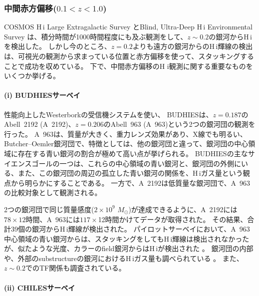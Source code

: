 \subsubsection{中間赤方偏移($0.1<z<1.0$)}

COSMOS H\,{\sc i} Large Extragalactic Survey \citep[CHILES,][]{2013ApJ...770L..29F}とBlind, Ultra-Deep H\,{\sc i} Environmental Survey \citep[BUDHIES,][]{2007ApJ...668L...9V}は、積分時間が1000時間程度にも及ぶ観測をして、$z\sim0.2$の銀河からH\,{\sc i}を検出した。
しかし今のところ、$z=0.2$よりも遠方の銀河からのH\,{\sc i}輝線の検出は、可視光の観測から求まっている位置と赤方偏移を使って、スタッキングすることで成功を収めている。
下で、中間赤方偏移のH {\sc i}観測に関する重要なものをいくつか挙げる。

\paragraph{(i) BUDHIESサーベイ \citep{2007ApJ...668L...9V}}

性能向上したWesterborkの受信機システムを使い、%
BUDHIESは、$z=0.187$のAbell~2192 (A~2192)、$z=0.206$のAbell~963 (A~963)という2つの銀河団の観測を行った。
A~963は、質量が大きく、重力レンズ効果があり、X線でも明るい、Butcher--Oemler銀河団で、特徴としては、他の銀河団と違って、銀河団の中心領域に存在する青い銀河の割合が極めて高い点が挙げられる。
BUDHIESの主なサイエンスゴールの一つは、これらの中心領域の青い銀河と、銀河団の外側にいる、また、この銀河団の周辺の孤立した青い銀河の関係を、H\,{\sc i}ガス量という観点から明らかにすることである。
一方で、A~2192は低質量な銀河団で、A~963の比較対象として観測される。

2つの銀河団で同じ質量感度($2\times10^9$ $M_\odot$)が達成できるように、A~2192には$78\times12$時間、A~963には$117\times$12時間かけてデータが取得された。
その結果、合計39個の銀河からH\,{\sc i}輝線が検出された。
パイロットサーベイにおいて、A~963中心領域の青い銀河からは、スタッキングをしてもH\,{\sc i}輝線は検出されなかったが、似たような光度、カラーのfield銀河からはH\,{\sc i}が検出された \citep{2007ApJ...668L...9V}。
銀河団の内部や、外部のsubstructureの銀河におけるH\,{\sc i}ガス量も調べられている \citep{2013MNRAS.431.2111J}。
また、$z\sim0.2$でのTF関係も調査されている。

\paragraph{(ii) CHILESサーベイ \citep{2013ApJ...770L..29F}}

